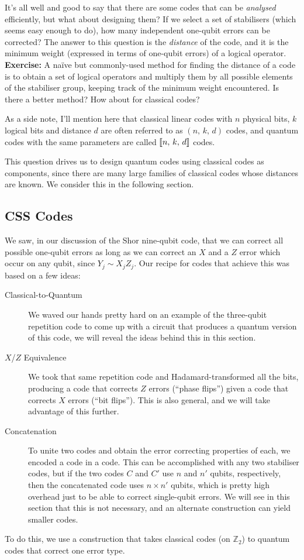 \documentclass[10pt,a4paper, english]{scrartcl}
\begin{document}
It's all well and good to say that there are some codes that can be \emph{analysed} efficiently, but what about designing them?
If we select a set of stabilisers (which seems easy enough to do), how many independent one-qubit errors can be corrected?
The answer to this question is the \emph{distance} of the code, and it is the minimum weight (expressed in terms of one-qubit errors) of a logical operator.\\ 
\textbf{Exercise: }A na\"ive but commonly-used method for finding the distance of a code is to obtain a set of logical operators and multiply them by all possible elements of the stabiliser group, keeping track of the minimum weight encountered. Is there a better method? How about for classical codes?

As a side note, I'll mention here that classical linear codes with $n$ physical bits, $k$ logical bits and distance $d$ are often referred to as $(n,\,k,\,d)$ codes, and quantum codes with the same parameters are called $\llbracket n,\,k,\,d \rrbracket$ codes.

This question drives us to design quantum codes using classical codes as components, since there are many large families of classical codes whose distances are known. 
We consider this in the following section.
\subsection{CSS Codes}
We saw, in our discussion of the Shor nine-qubit code, that we can correct all possible one-qubit errors as long as we can correct an $X$ and a $Z$ error which occur on any qubit, since $Y_j \sim X_j Z_j$. 
Our recipe for codes that achieve this was based on a few ideas:
\begin{description}
\item[Classical-to-Quantum] We waved our hands pretty hard on an example of the three-qubit repetition code to come up with a circuit that produces a quantum version of this code, we will reveal the ideas behind this in this section.
\item[$X$/$Z$ Equivalence] We took that same repetition code and Hadamard-transformed all the bits, producing a code that corrects $Z$ errors (``phase flips'') given a code that corrects $X$ errors (``bit flips''). 
This is also general, and we will take advantage of this further.
\item[Concatenation] To unite two codes and obtain the error correcting properties of each, we encoded a code in a code. 
This can be accomplished with any two stabiliser codes, but if the two codes $C$ and $C'$ use $n$ and $n'$ qubits, respectively, then the concatenated code uses $n \times n'$ qubits, which is pretty high overhead just to be able to correct single-qubit errors. 
We will see in this section that this is not necessary, and an alternate construction can yield smaller codes. 
\end{description}
To do this, we use a construction that takes classical codes (on $\mathbb{Z}_2$) to quantum codes that correct one error type.
\end{document}
